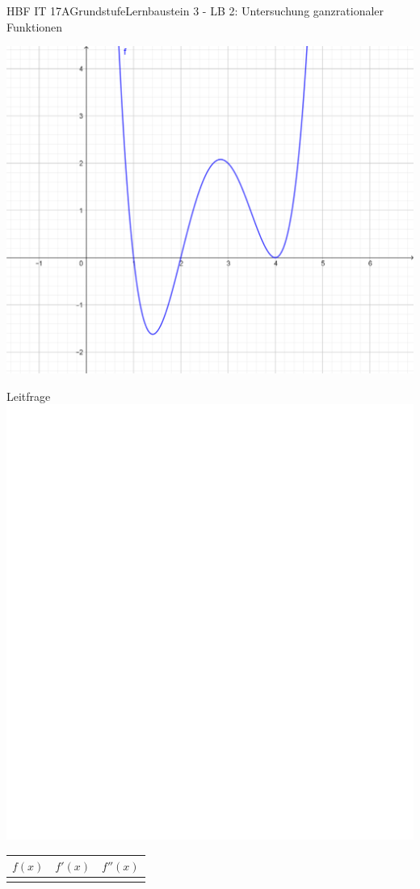 \documentclass[oneside,openany,headings=optiontotoc,11pt,numbers=noenddot]{scrreprt}
\begin{document}
	\begin{worksheet}{HBF IT 17A}{Grundstufe}{Lernbaustein 3 - LB 2: Untersuchung ganzrationaler Funktionen}

		\begin{framed}
			\noindent
			\includegraphics[scale=0.55]{Bilder/UB_fkt.png}\\
		\end{framed}
	
		\begin{framed}
			\noindent
			\tiny{\color{codegray}Leitfrage}\\
			\includegraphics[scale=0.15]{../empty.jpg}
		\end{framed}
		
		\noindent
		\begin{tabularx}{\textwidth}{|X|X|X|}
			\hline
			\multicolumn{1}{|c|}{\(f(x)\)} & \multicolumn{1}{c|}{\(f'(x)\)} & \multicolumn{1}{c|}{\(f''(x)\)}\\
			\hline
			\hline
			\rule{0pt}{120pt}&&\\
			\hline		
		\end{tabularx}
	\end{worksheet}
\end{document}
